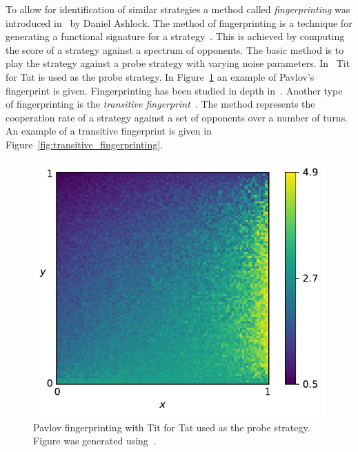 To allow for identification of similar strategies a method called
\textit{fingerprinting} was introduced in~\cite{Ashlock2005} by Daniel Ashlock. The method of fingerprinting is a
technique for generating a functional signature for a
strategy~\cite{Ashlock2008}. This is achieved by computing the score of a
strategy against a spectrum of opponents. The basic method is to play the
strategy against a probe strategy with varying noise parameters.
In~\cite{Ashlock2005} Tit for Tat is used as the probe strategy. In
Figure~\ref{fig:fingerprinting} an example of Pavlov's fingerprint is given.
Fingerprinting has been studied in depth in~\cite{Ashlock2008, Ashlock2009,
Ashlock2010, Ashlock2006a}. Another type of fingerprinting is the
\textit{transitive fingerprint}~\cite{axelrodproject}.
The method represents the cooperation rate of a strategy against a set of opponents
over a number of turns. An example of a transitive fingerprint is given in
Figure~\ref{fig:transitive_fingerprinting}.

\begin{figure}[!hbtp]
    \centering
    \includegraphics[height=.3\textheight]{src/chapters/02/img/Win-Stay_Lose-Shift}
    \caption{Pavlov fingerprinting with Tit for Tat used as the probe strategy.
    Figure was generated using~\cite{axelrodproject}.}
    \label{fig:fingerprinting}
\end{figure}

